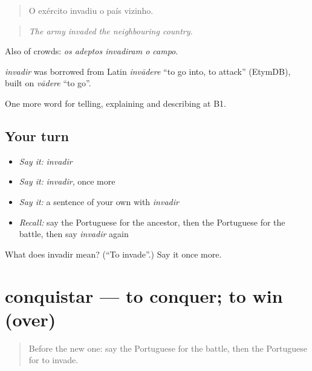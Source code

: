 \begin{quote}
O exército invadiu o país vizinho.
\end{quote}

\begin{quote}
\emph{The army invaded the neighbouring country.}
\end{quote}

Also of crowds: \emph{os adeptos invadiram o campo}.

\begin{cousinweb}
\emph{invadir} was borrowed from Latin \emph{invādere} \textquotedblleft{}to go into, to attack\textquotedblright{} (EtymDB), built on \emph{vādere} \textquotedblleft{}to go\textquotedblright{}.
\end{cousinweb}

\begin{grammarlens}[title={What you've built}]
One more word for telling, explaining and describing at B1.
\end{grammarlens}

\subsection*{Your turn}
\begin{itemize}
\raggedright
  \item \emph{Say it:} \emph{invadir}
  \item \emph{Say it:} \emph{invadir}, once more
  \item \emph{Say it:} a sentence of your own with \emph{invadir}
  \item \emph{Recall:} say the Portuguese for the ancestor, then the Portuguese for the battle, then say \emph{invadir} again
\end{itemize}

\begin{tcolorbox}[breakable,colback=teal!4,colframe=teal!35!black,title={Before you move on}]
What does invadir mean? (\textquotedblleft{}To invade\textquotedblright{}.) Say it once more.
\end{tcolorbox}
\section[conquistar]{conquistar — to conquer; to win (over)}

\label{lesson:PT-C329-conquistar}



\begin{quote}
Before the new one: say the Portuguese for the battle, then the Portuguese for to invade.
\end{quote}

